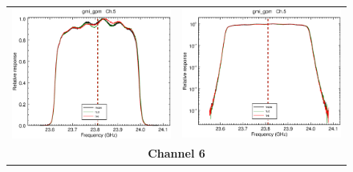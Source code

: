 \begin{figure}[H]
\begin{tabular}{c c}
    \includegraphics[scale=0.35]{graphics/lin/gmi_gpm-5.eps} &
    \includegraphics[scale=0.35]{graphics/log/gmi_gpm-5.eps} \\
    \multicolumn{2}{c}{\sffamily\textbf{Channel 6}}\\

\end{tabular}
\end{figure}
